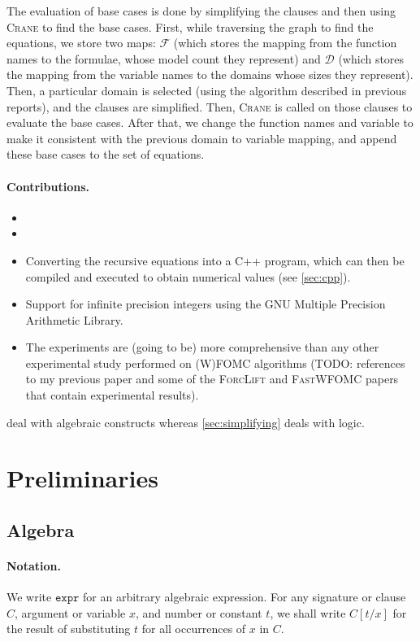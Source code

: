 \documentclass{article}
\newcommand{\expr}{\mathtt{expr}}
\begin{document}
The evaluation of base cases is done by simplifying the clauses and then using
\textsc{Crane} to find the base cases. First, while traversing the graph to find
the equations, we store two maps: $\mathcal{F}$ (which stores the mapping from
the function names to the formulae, whose model count they represent) and
$\mathcal{D}$ (which stores the mapping from the variable names to the domains
whose sizes they represent). Then, a particular domain is selected (using the
algorithm described in previous reports), and the clauses are simplified. Then,
\textsc{Crane} is called on those clauses to evaluate the base cases. After
that, we change the function names and variable to make it consistent with the
previous domain to variable mapping, and append these base cases to the set of
equations.

\paragraph{Contributions.}
\begin{itemize}
  \item {}
  \item {}
  \item Converting the recursive equations into a C++ program, which can then be
        compiled and executed to obtain numerical values (see \cref{sec:cpp}).
  \item Support for infinite precision integers using the GNU Multiple Precision
        Arithmetic Library.
  \item The experiments are (going to be) more comprehensive than any other
        experimental study performed on (W)FOMC algorithms (TODO: references to
        my previous paper and some of the \textsc{ForcLift} and
        \textsc{FastWFOMC} papers that contain experimental results).
\end{itemize}

 deal with algebraic constructs whereas
\cref{sec:simplifying} deals with logic.

\section{Preliminaries}

\subsection{Algebra}

\paragraph{Notation.}
We write $\expr{}$ for an arbitrary algebraic expression. For any signature or
clause $C$, argument or variable $x$, and number or constant $t$, we shall write
$C[t / x]$ for the result of substituting $t$ for all occurrences of $x$ in $C$.
\end{document}
